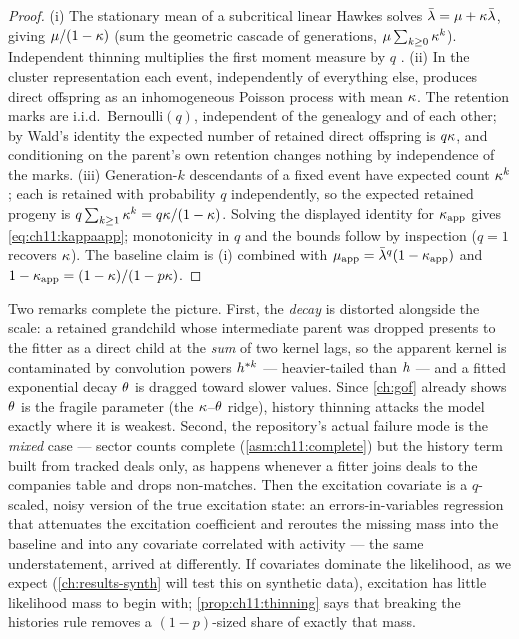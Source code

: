 \begin{proof}
(i) The stationary mean of a subcritical linear Hawkes solves
$\bar{\lambda} = \mu + \kappa\bar{\lambda}$, giving $\mu/(1-\kappa)$ (sum the
geometric cascade of generations, $\mu\sum_{k\ge0}\kappa^k$).
Independent thinning multiplies the first moment measure by $q$
\citep[Ch.~11]{daley2003}.
(ii) In the cluster representation each event, independently of
everything else, produces direct offspring as an inhomogeneous Poisson
process with mean $\kappa$. The retention marks are i.i.d.\
Bernoulli$(q)$, independent of the genealogy and of each other; by
Wald's identity the expected number of retained direct offspring is
$q\kappa$, and conditioning on the parent's own retention changes
nothing by independence of the marks.
(iii) Generation-$k$ descendants of a fixed event have expected count
$\kappa^k$; each is retained with probability $q$ independently, so the
expected retained progeny is $q\sum_{k\ge1}\kappa^k =
q\kappa/(1-\kappa)$. Solving the displayed identity for
$\kappa_{\mathrm{app}}$ gives \cref{eq:ch11:kappaapp}; monotonicity in
$q$ and the bounds follow by inspection ($q=1$ recovers $\kappa$). The
baseline claim is (i) combined with
$\mu_{\mathrm{app}} = \bar{\lambda}^q(1-\kappa_{\mathrm{app}})$ and
$1-\kappa_{\mathrm{app}} = (1-\kappa)/(1-p\kappa)$.
\end{proof}

Two remarks complete the picture. First, the \emph{decay} is distorted
alongside the scale: a retained grandchild whose intermediate parent was
dropped presents to the fitter as a direct child at the \emph{sum} of two
kernel lags, so the apparent kernel is contaminated by convolution powers
$h^{*k}$ --- heavier-tailed than $h$ --- and a fitted
exponential decay $\theta$ is dragged toward slower values. Since
\cref{ch:gof} already shows $\theta$ is the fragile parameter
(the $\kappa$--$\theta$ ridge), history thinning attacks the model
exactly where it is weakest. Second, the repository's actual failure mode
is the \emph{mixed} case --- sector counts complete
(\cref{asm:ch11:complete}) but the history term built from tracked deals
only, as happens whenever a fitter joins deals to the companies table and
drops non-matches. Then the excitation covariate is a $q$-scaled, noisy
version of the true excitation state: an errors-in-variables regression
that attenuates the excitation coefficient and reroutes the missing mass
into the baseline and into any covariate correlated with activity --- the
same understatement, arrived at differently. If covariates dominate the
likelihood, as we expect (\cref{ch:results-synth} will test this on
synthetic data), excitation has little likelihood mass to begin with;
\cref{prop:ch11:thinning} says that breaking the histories rule removes
a $(1-p)$-sized share of exactly that mass.

